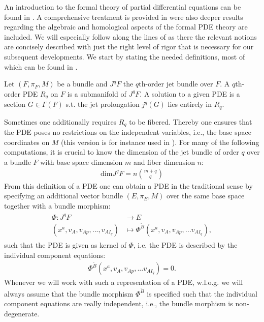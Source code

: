An introduction to the formal theory of partial differential equations can be found in \cite{saunders_1989}. A comprehensive treatment is provided in \cite{seiler2009involution} were also deeper results regarding the algebraic and homological aspects of the formal PDE theory are included. We will especially follow along the lines of \cite{seiler1994analysis} as there the relevant notions are concisely described with just the right level of rigor that is necessary for our subsequent developments. We start by stating the needed definitions, most of which can be found in \cite{seiler1994analysis}.
\begin{definition}[PDE]
Let $(F,\pi_F,M)$ be a bundle and $J^qF$ the $q$th-order jet bundle over $F$. A $q$th-order PDE $R_q$ on $F$ is a  submanifold of $J^qF$. A solution to a given PDE is a section $G \in \Gamma(F)$ s.t. the jet prolongation $j^q(G)$ lies entirely in $R_q$.  
\end{definition}
Sometimes one additionally requires $R_q$ to be fibered. Thereby one ensures that the PDE poses no restrictions on the independent variables, i.e., the base space coordinates on $M$ (this version is for instance used in \cite{seiler1994analysis}).
For many of the following computations, it is crucial to know the dimension of the jet bundle of order $q$ over a bundle $F$ with base space dimension $m$ and fiber dimension $n$:
\begin{align}
    \mathrm{dim}J^qF = n\binom{m+q}{q}
\end{align}
From this definition of a PDE one can obtain a PDE in the traditional sense by specifying an additional vector bundle $(E,\pi_E,M)$ over the same base space together with a bundle morphism:
\begin{align}
    \begin{aligned}
    \Phi : J^qF &\longrightarrow E\\
    (x^a, v_A, v_{Ap},...,v_{AI_q}) &\longmapsto \Phi^{\tilde{B}}(x^a, v_A, v_{Ap},...v_{AI_q}),
    \end{aligned}
\end{align}
such that the PDE is given as kernel of $\Phi$, i.e.
the PDE is described by the individual component  equations:
\begin{align}
    \Phi^{\tilde{B}}(x^a, v_A, v_{Ap},...v_{AI_q}) = 0.
\end{align}
Whenever we will work with such a representation of a PDE, w.l.o.g. we will always assume that the bundle morphism $\Phi^{\tilde{B}}$ is specified such that the individual component equations are really independent, i.e., the bundle morphism is non-degenerate. 


